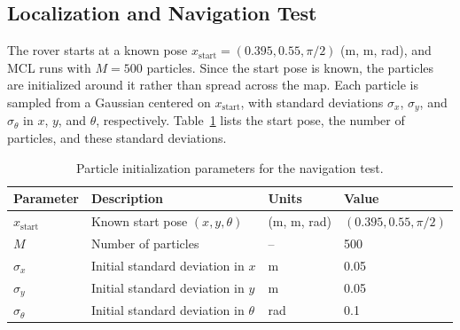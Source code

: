 %

\subsection{Localization and Navigation Test}
\label{sec:navigation-test}

The rover starts at a known pose $x_{\mathrm{start}} = (0.395, 0.55, \pi/2)$ (m, m, rad),
and MCL runs with
$M = 500$ particles. Since the start pose is known, the particles are initialized around it
rather than spread across the map. Each particle is sampled from a Gaussian centered on
$x_{\mathrm{start}}$, with standard deviations $\sigma_x$, $\sigma_y$, and $\sigma_\theta$ in
$x$, $y$, and $\theta$, respectively. Table~\ref{tab:init-params} lists the start pose, the
number of particles, and these standard deviations.
\begin{table}[htbp]
  \centering
  \caption{Particle initialization parameters for the navigation test.}
  \label{tab:init-params}
  \small
  \begin{tabular}{l l l l}
    \hline
    Parameter & Description & Units & Value \\
    \hline
    $x_{\mathrm{start}}$ & Known start pose $(x, y, \theta)$ & (m, m, rad) & $(0.395, 0.55, \pi/2)$ \\
    $M$                  & Number of particles               & --          & 500 \\
    $\sigma_x$           & Initial standard deviation in $x$ & m           & 0.05 \\
    $\sigma_y$           & Initial standard deviation in $y$ & m           & 0.05 \\
    $\sigma_\theta$      & Initial standard deviation in $\theta$ & rad    & 0.1 \\
    \hline
  \end{tabular}
\end{table}

